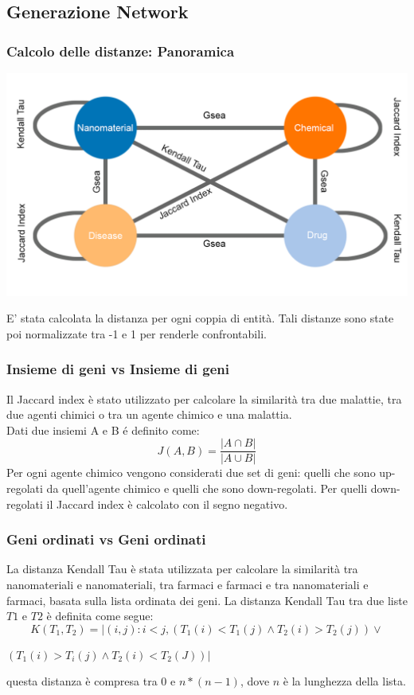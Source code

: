 \documentclass{beamer}
\begin{document}
\subsection{Generazione Network}
\begin{frame}
\frametitle{Calcolo delle distanze: Panoramica}
\begin{center}
\includegraphics[scale=0.20]{img/Grafo.png}
\end{center}
E' stata calcolata la distanza per ogni coppia di entità. Tali distanze sono state poi normalizzate tra -1 e 1 per renderle confrontabili.
\end{frame}

\begin{frame}
\frametitle{Insieme di geni vs Insieme di geni}
Il Jaccard index è stato utilizzato per calcolare la similarità tra due malattie, tra due agenti chimici o tra un agente chimico e una malattia.\\
Dati due insiemi A e B \'e definito come:
\begin{equation} 
J(A, B) = \frac{|A \cap B|}{|A \cup  B|}
\end{equation}
Per ogni agente chimico vengono considerati due set di geni: quelli che sono up-regolati da quell'agente chimico e quelli che sono down-regolati.
Per quelli down-regolati il Jaccard index è calcolato con il segno negativo.
\end{frame}

\begin{frame}
\frametitle{Geni ordinati vs Geni ordinati}
La distanza Kendall Tau è stata utilizzata per calcolare la similarità tra nanomateriali e nanomateriali, tra farmaci e farmaci e tra nanomateriali e farmaci, basata sulla lista ordinata dei geni.
La distanza Kendall Tau tra due liste $T1$ e $T2$ è definita come segue:
\begin{equation}
K(T_1, T_2) = |(i, j): i < j, (T_1(i) < T_1(j) \wedge  T_2(i) > T_2(j)) \vee
\end{equation}
\begin{center}
	$ (T_1(i) > T_i(j) \wedge T_2(i) < T_2(J))  | $
\end{center}
questa distanza è compresa tra 0 e $n*(n -1)$, dove $n$ è la lunghezza della lista. 
\end{frame}
\end{document}
